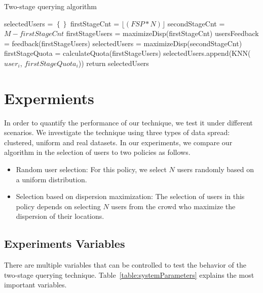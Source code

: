 \documentclass{acm_proc_article-sp}
\newcommand\floor[1]{\lfloor#1\rfloor}
\begin{document}
\begin{algorithm}
\caption{Two-stage querying algorithm}
\label{TSalgorithm}
    \begin{algorithmic}[1]
            \State selectedUsers = $\left\{\right\}$
            \State firstStageCnt = $\floor{(FSP*N)}$
            \State secondStageCnt = $M - firstStageCnt$
            \State firstStageUsers = maximizeDisp(firstStageCnt)
            \State usersFeedback = feedback(firstStageUsers)
                   \State selectedUsers = maximizeDisp(secondStageCnt){}
            \Else
            \EndIf    
          \State firstStageQuota = calculateQuota(firstStageUsers)
        \State selectedUsers.append(KNN($user_i$, $firstStageQuota_i$))
      \EndFor
\State return {selectedUsers}
\EndFunction
\end{algorithmic}
\end{algorithm}

\section{Expermients}
In order to quantify the performance of our technique, we test it under different scenarios. We investigate the technique using three types of data spread: clustered, uniform and real datasets. In our experiments, we compare our algorithm in the selection of users to two policies as follows.
\begin{itemize}
\item Random user selection: For this policy, we select $N$ users randomly based on a uniform distribution.
\item Selection based on dispersion maximization: The selection of users in this policy depends on selecting $N$ users from the crowd who maximize the dispersion of their locations.
\end{itemize}
\subsection{Experiments Variables}
There are multiple variables that can be controlled to test the behavior of the two-stage querying technique. Table~\ref{table:systemParameters} explains the most important variables.
\end{document}
